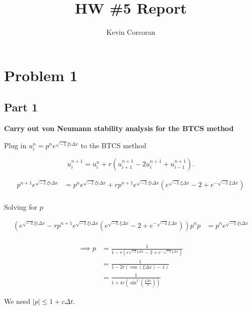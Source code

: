 \documentclass[12pt,a4paper]{article}
\title{ HW \#5 Report}
\author{ Kevin Corcoran }
\begin{document}
\maketitle

\section{Problem 1}%
\label{sec:problem_1}

\subsection{Part 1}%
\label{sub:part_1}

\textbf{Carry out von Neumann stability analysis for the BTCS method} 

\vspace{15px}
\par Plug in $u_{i}^{n} = p^{n}e^{\sqrt{-1}\xi i\Delta x}$ to the BTCS method

\[
u_{i}^{n+1}=u_{i}^{n} + r \left(u_{i+1}^{n+1}-2u_{i}^{n+1}+u_{i-1}^{n+1}\right)
.\] 

\begin{align*}
  p^{n+1}e^{\sqrt{-1}\xi i\Delta x} &= p^{n}e^{\sqrt{-1}\xi i\Delta x}
  + r p^{n+1}e^{\sqrt{-1}\xi i\Delta x} \left(e^{\sqrt{-1}\xi\Delta x}
  - 2 + e^{-\sqrt{-1}\xi\Delta x} \right) \\
\end{align*}

\par Solving for $p$

\begin{align*}
  \left(e^{\sqrt{-1}\xi i\Delta x} -  r p^{n+1}e^{\sqrt{-1}\xi i\Delta x} \left(e^{\sqrt{-1}\xi\Delta x}
  - 2 + e^{-\sqrt{-1}\xi\Delta x}\right)\right) p^{n}p &= p^{n}e^{\sqrt{-1}\xi
i\Delta x} \\
\end{align*}

\begin{align*}
\implies p &= \frac{1}{1 - r \left(e^{\sqrt{-1}\xi \Delta x}
- 2 + e^{-\sqrt{-1}\xi \Delta x}\right)} \\
           &= \frac{1}{1 - 2r \left(\cos(\xi\Delta x) - 1\right) } \\
 &= \frac{1}{1 + 4r \left( \sin^2( \frac{\xi\Delta x}{2})\right) } 
\end{align*}


\vspace{15px}
\par We need $|p| \leq 1 + c\Delta t$. 
\vspace{15px}
\end{document}
